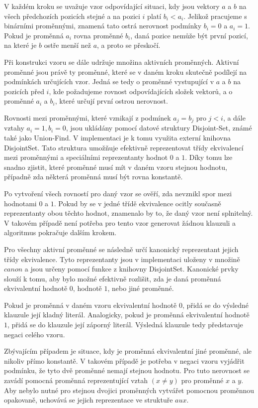 V každém kroku se uvažuje vzor odpovídající situaci, kdy jsou vektory $a$ a $b$ na všech předchozích pozicích stejné a na pozici $i$ platí $b_i < a_i$. Jelikož pracujeme s binárními proměnnými, znamená tato ostrá nerovnost podmínky $b_i = 0$ a $a_i = 1$. Pokud je proměnná $a_i$ rovna proměnné $b_i$, daná pozice nemůže být první pozicí, na které je $b$ ostře menší než $a$, a proto se přeskočí.

Při konstrukci vzoru se dále udržuje množina aktivních proměnných. Aktivní proměnné jsou právě ty proměnné, které se v daném kroku skutečně podílejí na podmínkách určujících vzor. Jedná se tedy o proměnné vystupující v $a$ a $b$ na pozicích před $i$, kde požadujeme rovnost odpovídajících složek vektorů, a o proměnné $a_i$ a $b_i$, které určují první ostrou nerovnost.

Rovnosti mezi proměnnými, které vznikají z podmínek $a_j = b_j$ pro $j < i$, a dále vztahy $a_i = 1, b_i = 0$, jsou ukládány pomocí datové struktury Disjoint-Set, známé také jako Union-Find. V implementaci je k tomu využita externí knihovna DisjointSet. Tato struktura umožňuje efektivně reprezentovat třídy ekvivalencí mezi proměnnými a speciálními reprezentanty hodnot $0$ a $1$. Díky tomu lze snadno zjistit, které proměnné musí mít v daném vzoru stejnou hodnotu, případně zda některá proměnná musí být rovna konstantě.

Po vytvoření všech rovností pro daný vzor se ověří, zda nevznikl spor mezi hodnotami $0$ a $1$. Pokud by se v jedné třídě ekvivalence ocitly současně reprezentanty obou těchto hodnot, znamenalo by to, že daný vzor není splnitelný. V takovém případě není potřeba pro tento vzor generovat žádnou klauzuli a algoritmus pokračuje dalším krokem.

Pro všechny aktivní proměnné se následně určí kanonický reprezentant jejich třídy ekvivalence. Tyto reprezentanty jsou v implementaci uloženy v množině $canon$ a jsou určeny pomocí funkce z knihovny DisjointSet. Kanonické prvky slouží k tomu, aby bylo možné efektivně rozlišit, zda je daná proměnná ekvivalentní hodnotě $0$, hodnotě $1$, nebo jiné proměnné.

Pokud je proměnná v daném vzoru ekvivalentní hodnotě $0$, přidá se do výsledné klauzule její kladný literál. Analogicky, pokud je proměnná ekvivalentní hodnotě $1$, přidá se do klauzule její záporný literál. Výsledná klauzule tedy představuje negaci celého vzoru.

Zbývajícím případem je situace, kdy je proměnná ekvivalentní jiné proměnné, ale nikoliv přímo konstantě. V takovém případě je potřeba v negaci vzoru vyjádřit podmínku, že tyto dvě proměnné nemají stejnou hodnotu. Pro tuto nerovnost se zavádí pomocná proměnná reprezentující vztah $(x \neq y)$ pro proměnné $x$ a $y$. Aby nebylo nutné pro stejnou dvojici proměnných vytvářet pomocnou proměnnou opakovaně, uchovává se jejich reprezentace ve struktuře $aux$.

